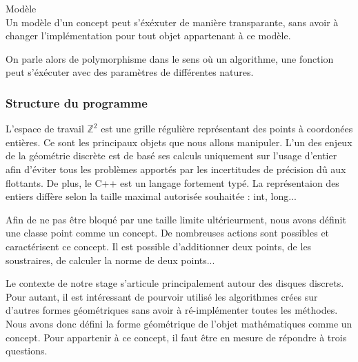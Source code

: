 \begin{Definition}{Modèle}\\
  Un modèle d'un concept peut s'éxéxuter de manière transparante, sans avoir à changer l'implémentation pour tout objet appartenant à ce modèle. 
\label{def:cpp-mod}

\end{Definition}

On parle alors de polymorphisme dans le sens où un algorithme, une fonction peut s'éxécuter avec des paramètres de différentes natures.

\subsubsection{Structure du programme}

L'espace de travail $\mathbb{Z}^{2}$ est une grille régulière représentant des points à coordonées entières. Ce sont les principaux objets que nous allons manipuler. L'un des enjeux de la géométrie discrète est de basé ses calculs uniquement sur l'usage d'entier afin d'éviter tous les problèmes apportés par les incertitudes de précision dû aux flottants. De plus, le C++ est un langage fortement typé. La représentaion des entiers diffère selon la taille maximal autorisée souhaitée : int, long...

Afin de ne pas être bloqué par une taille limite ultérieurment, nous avons définit une classe point comme un concept. De nombreuses actions sont possibles et caractérisent ce concept. Il est possible d'additionner deux points, de les soustraires, de calculer la norme de deux points...

Le contexte de notre stage s'articule principalement autour des disques discrets. Pour autant, il est intéressant de pourvoir utilisé les algorithmes crées sur d'autres formes géométriques sans avoir à ré-implémenter toutes les méthodes. Nous avons donc défini la forme géométrique de l'objet mathématiques comme un concept. Pour appartenir à ce concept, il faut être en mesure de répondre à trois questions.

